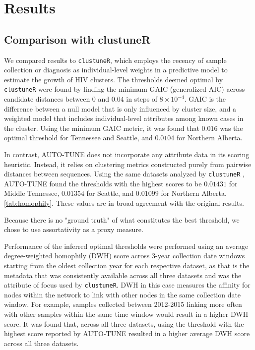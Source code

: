 \documentclass[utf8]{FrontiersinHarvard} %
\newcommand{\TODO}[1]{{\color{red}{#1}}}
\begin{document}
\section{Results}

\subsection{Comparison with clustuneR}

We compared results to {\tt clustuneR}, which employs the recency of sample
collection or diagnosis as individual-level weights in a predictive model to
estimate the growth of HIV clusters. The thresholds deemed optimal by
{\tt clustuneR} were found by finding the minimum GAIC (generalized AIC) across
candidate distances between $0$ and $0.04$ in steps of $8 \times 10^{-4}$. GAIC is
the difference between a null model that is only influenced by cluster size,
and a weighted model  that includes individual-level attributes among
known cases in the cluster. Using the minimum GAIC metric, it was found that
$0.016$ was the optimal threshold for Tennessee and Seattle, and $0.0104$ for
Northern Alberta.

In contrast, AUTO-TUNE does not incorporate any attribute data in its scoring
heuristic. Instead, it relies on clustering metrics constructed purely from
pairwise distances between sequences. Using the same datasets analyzed by
{\tt clustuneR} \cite{chato_public_2020}, AUTO-TUNE found the thresholds with the
highest scores to be $0.01431$ for Middle Tennessee, $0.01354$ for Seattle, and
$0.01099$ for Northern Alberta. \autoref{tab:homophily}.  
These values are in broad agreement with the original results.

\TODO{discuss how our thresholds perform vs the published thresholds; look at the GAIC plots}

Because there is no "ground truth" of what constitutes the best threshold, we chose to use assortativity as a proxy measure.
\TODO{this may need more justification}

Performance of the inferred optimal thresholds were performed using an average
degree-weighted homophily (DWH) score across 3-year collection date windows
starting from the oldest collection year for each respective dataset, as that
is the metadata that was consistently available across all three datasets and
was the attribute of focus used by {\tt clustuneR}. DWH in this case measures the
affinity for nodes within the network to link with other nodes in the same
collection date window. For example, samples collected between 2012-2015
linking more often with other samples within the same time window would result
in a higher DWH score. It was found that, across all three datasets, using the
threshold with the highest score reported by AUTO-TUNE resulted in a higher
average DWH score across all three datasets. \TODO{compared to what?}
\end{document}
